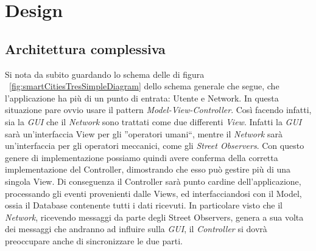 \documentclass[a4paper,12pt]{report}
\begin{document}
\chapter{Design}

\section{Architettura complessiva}

Si nota da subito guardando lo schema delle di figura 
~\ref{fig:smartCitiesTresSimpleDiagram} dello schema generale che segue, 
che l'applicazione ha più di un punto di entrata: Utente e Network. In questa 
situazione pare ovvio usare il pattern \textit{Model-View-Controller}. Così 
facendo infatti, sia la \textit{GUI} che il \textit{Network} sono trattati come 
due differenti \textit{View}. Infatti la \textit{GUI} sarà un'interfaccia View 
per gli ''operatori umani``, mentre il \textit{Network} sarà un'interfaccia per 
gli operatori meccanici, come gli \textit{Street Observers}.
Con questo genere di implementazione possiamo quindi avere conferma della 
corretta implementazione del Controller, dimostrando che esso può gestire più di 
una singola View.\newline
Di conseguenza il Controller sarà punto cardine dell'applicazione, processando 
gli eventi provenienti dalle Views, ed interfacciandosi con il Model, ossia il 
Database contenente tutti i dati ricevuti. 
In particolare visto che il \textit{Network}, ricevendo messaggi da parte degli 
Street Observers, genera a sua volta dei messaggi che andranno ad influire 
sulla \textit{GUI}, il \textit{Controller} si dovrà preoccupare anche di 
sincronizzare le due parti.
\newpage
\end{document}
